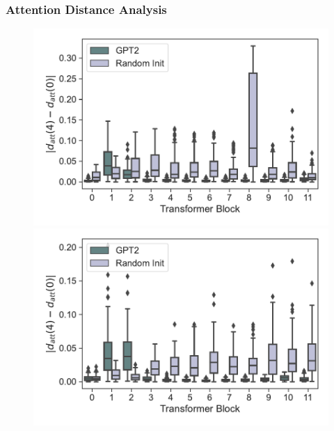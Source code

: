 \documentclass{article}
\begin{document}
\subsubsection{Attention Distance Analysis}
\label{appendix:results-for-other-conditions-attention-distance}
\begin{figure}[H]
    \centering
    \begin{minipage}[b]{0.32\linewidth}
        \includegraphics[width=\linewidth]{figs/att_dist_diff_0_1_gpt2_dt_hopper_medium_666_K1.pdf}
    \end{minipage}
    \begin{minipage}[b]{0.32\linewidth}
        \includegraphics[width=\linewidth]{figs/att_dist_diff_0_1_gpt2_dt_halfcheetah_medium_666_K1.pdf}
    \end{minipage}
    \begin{minipage}[b]{0.32\linewidth}

\end{minipage}
\end{figure}
\end{document}
